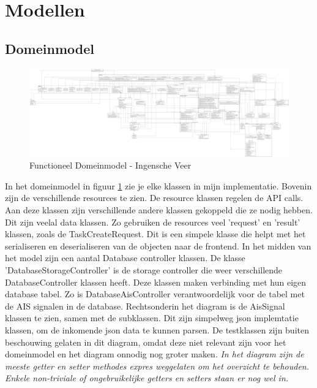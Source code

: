 \documentclass{article}
\begin{document}
\section{Modellen}
\subsection{Domeinmodel}
\begin{figure}[H]
    \includegraphics[width=1\textwidth]{images/FunctioneelKlassendiagram.png}
    \caption{Functioneel Domeinmodel - Ingensche Veer}
    \label{fig:dm}
\end{figure}
In het domeinmodel in figuur \ref{fig:dm} zie je elke klassen in mijn implementatie. Bovenin zijn de verschillende resources te zien. De resource klassen regelen de API calls. Aan deze klassen zijn verschillende andere klassen gekoppeld die ze nodig hebben. Dit zijn veelal data klassen. Zo gebruiken de resources veel 'request' en 'result' klassen, zoals de TaskCreateRequest. Dit is een simpele klasse die helpt met het serialiseren en deserialiseren van de objecten naar de frontend. 
In het midden van het model zijn een aantal Database controller klassen. De klasse 'DatabaseStorageController' is de storage controller die weer verschillende DatabaseController klassen heeft. Deze klassen maken verbinding met hun eigen database tabel. Zo is DatabaseAisController verantwoordelijk voor de tabel met de AIS signalen in de database.
Rechtsonderin het diagram is de AisSignal klassen te zien, samen met de subklassen. Dit zijn simpelweg json implemtatie klassen, om de inkomende json data te kunnen parsen.
De testklassen zijn buiten beschouwing gelaten in dit diagram, omdat deze niet relevant zijn voor het domeinmodel en het diagram onnodig nog groter maken.
\textit{In het diagram zijn de meeste getter en setter methodes expres weggelaten om het overzicht te behouden. Enkele non-triviale of ongebruikelijke getters en setters staan er nog wel in.}
\end{document}
